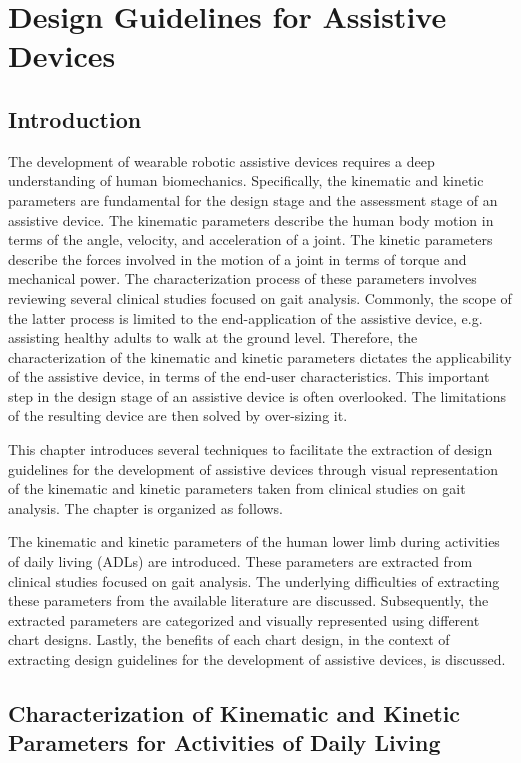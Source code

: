 \chapter{Design Guidelines for Assistive Devices} \label{sec:chapterDesignGuidelines}

\section{Introduction}

The development of wearable robotic assistive devices requires a deep understanding of human biomechanics. Specifically, the kinematic and kinetic parameters are fundamental for the design stage and the assessment stage of an assistive device. The kinematic parameters describe the human body motion in terms of the angle, velocity, and acceleration of a joint. The kinetic
parameters describe the forces involved in the motion of a joint in terms of torque and mechanical power. The characterization process of these parameters involves reviewing several clinical studies focused on gait analysis. Commonly, the scope of the latter process is limited to the end-application of the assistive device, e.g. assisting healthy adults to walk at the ground level. Therefore, the characterization of the kinematic and kinetic parameters dictates the applicability of the assistive device, in terms of the end-user characteristics. This important step in the design stage of an assistive device is often overlooked. The limitations of the resulting device are then solved by over-sizing it. 

This chapter introduces several techniques to facilitate the extraction of design guidelines for the development of assistive devices through visual representation of the kinematic and kinetic parameters taken from clinical studies on gait analysis. The chapter is organized as follows.

The kinematic and kinetic parameters of the human lower limb during activities of daily living (ADLs) are introduced. These parameters are extracted from clinical studies focused on gait analysis. The underlying difficulties of extracting these parameters from the available literature are discussed. Subsequently, the extracted parameters are categorized and visually represented using different chart designs. Lastly, the benefits of each chart design, in the context of extracting design guidelines for the development of assistive devices, is discussed.

\section{Characterization of Kinematic and Kinetic Parameters for Activities of Daily Living} \label{sec:characterizationKKP}

